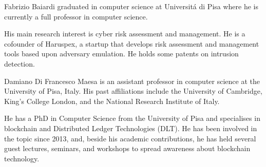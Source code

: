 \documentclass{ieeeaccess}
\begin{document}
\begin{IEEEbiography}{Fabrizio Baiardi} graduated in computer science at Universit\'a di Pisa where he is currently a full professor in computer science.
\par
His main research interest is cyber risk assessment and management. He is a cofounder of Haruspex, a startup that develops risk assessment and management tools based upon adversary emulation. He holds some patents on intrusion detection.
\end{IEEEbiography}

\begin{IEEEbiography}{Damiano Di Francesco Maesa} is an assistant professor in computer science at the University of Pisa, Italy. His past affiliations include the University of Cambridge, King's College London, and the National Research Institute of Italy.
\par
He has a PhD in Computer Science from the University of Pisa and specialises in blockchain and Distributed Ledger Technologies (DLT). He has been involved in the topic since 2013, and, beside his academic contributions, he has held several guest lectures, seminars, and workshops to spread awareness about blockchain technology.
\end{IEEEbiography}
\end{document}
